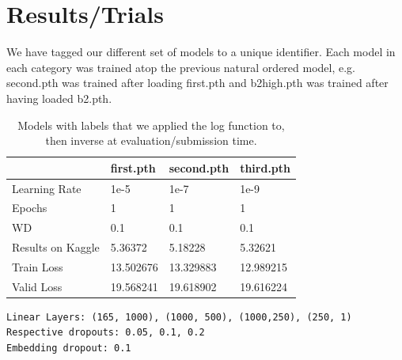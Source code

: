 \documentclass[10pt,twocolumn,letterpaper]{article}
\begin{document}
\section{Results/Trials}
  We have tagged our different set of models to a unique identifier. Each model
  in each category was trained atop the previous natural ordered model, e.g.
  second.pth was trained after loading first.pth and b2high.pth was trained
  after having loaded b2.pth.

\begin{table}[]
  \begin{center}
    \begin{tabular}{|l|l|l|l|}
    \hline
                      & first.pth & second.pth & third.pth \\ \hline
    Learning Rate     & 1e-5      & 1e-7       & 1e-9      \\ \hline
    Epochs            & 1         & 1          & 1         \\ \hline
    WD                & 0.1       & 0.1        & 0.1       \\ \hline
    Results on Kaggle & 5.36372   & 5.18228    & 5.32621   \\ \hline
    Train Loss        & 13.502676 & 13.329883  & 12.989215 \\ \hline
    Valid Loss        & 19.568241 & 19.618902  & 19.616224 \\ \hline
    \end{tabular}
    {\scriptsize
    \begin{verbatim}
Linear Layers: (165, 1000), (1000, 500), (1000,250), (250, 1)
Respective dropouts: 0.05, 0.1, 0.2
Embedding dropout: 0.1
    \end{verbatim}}
  \end{center}
  \caption{Models with labels that we applied the log function to, then inverse
  at evaluation/submission time.}
\end{table}
\end{document}
